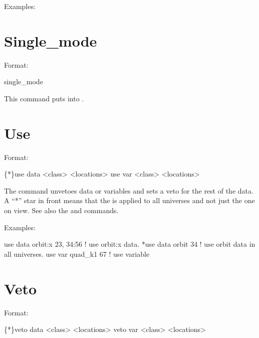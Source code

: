 Examples:

\section{Single\_mode}
\label{s:singe_cmd}

Format:
\begin{example}
  single_mode
\end{example}

\vskip 0.2in 
This command puts \tao into . 

\section{Use}
\label{s:use}

Format:
\begin{example}
  \{*\}use data  <class> <locations>
  use var <class> <locations>
\end{example}

\vskip 0.2in 
The  command  unvetoes data or variables
and sets a veto for the rest of the data.
A ``*'' star in front means that the  is applied
to all universes and not just the one on view. See also the 
and  commands.

Examples:
\begin{example}
  use data orbit:x  23, 34:56 ! use orbit:x data.
  *use data orbit 34          ! use orbit data in all universes.
  use var quad_k1 67          ! use variable
\end{example}


\section{Veto}
\label{s:veto}

Format:
\begin{example}
  \{*\}veto data  <class> <locations>
  veto var <class> <locations>
\end{example}

